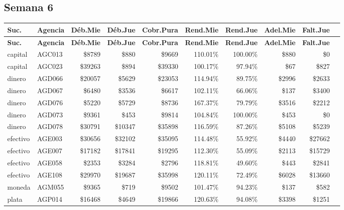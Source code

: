 \documentclass[11pt,a4paper]{article}
\newcommand{\money}[1]{\$\num{#1}}
\begin{document}
\begin{center}
\begin{longtable}{llrrrrrrrr}
\bottomrule
\end{longtable}
\end{center}

\subsection{Semana 6}


\begin{center}
\renewcommand{\arraystretch}{1.2}
\footnotesize
\begin{longtable}{llrrrrrrrr}
\toprule
\textbf{Suc.} & \textbf{Agencia}
  & {\textbf{D\'eb.Mie}} & {\textbf{D\'eb.Jue}} & {\textbf{Cobr.Pura}}
  & {\textbf{Rend.Mie}} & {\textbf{Rend.Jue}}
  & {\textbf{Adel.Mie}} & {\textbf{Falt.Jue}} \\
\midrule
\endfirsthead
\toprule
\textbf{Suc.} & \textbf{Agencia}
  & {\textbf{D\'eb.Mie}} & {\textbf{D\'eb.Jue}} & {\textbf{Cobr.Pura}}
  & {\textbf{Rend.Mie}} & {\textbf{Rend.Jue}}
  & {\textbf{Adel.Mie}} & {\textbf{Falt.Jue}} \\
\midrule
\endhead
capital & AGC013 & \money{8789} & \money{880} & \money{9669} & 110.01\% & 100.00\% & \money{880} & \money{0} \\
capital & AGC023 & \money{39263} & \money{894} & \money{39330} & 100.17\% & 97.94\% & \money{67} & \money{827} \\
dinero & AGD066 & \money{20057} & \money{5629} & \money{23053} & 114.94\% & 89.75\% & \money{2996} & \money{2633} \\
dinero & AGD067 & \money{6480} & \money{3536} & \money{6617} & 102.11\% & 66.06\% & \money{137} & \money{3400} \\
dinero & AGD076 & \money{5220} & \money{5729} & \money{8736} & 167.37\% & 79.79\% & \money{3516} & \money{2212} \\
dinero & AGD073 & \money{9361} & \money{453} & \money{9814} & 104.84\% & 100.00\% & \money{453} & \money{0} \\
dinero & AGD078 & \money{30791} & \money{10347} & \money{35898} & 116.59\% & 87.26\% & \money{5108} & \money{5239} \\
efectivo & AGE003 & \money{30656} & \money{32102} & \money{35095} & 114.48\% & 55.92\% & \money{4440} & \money{27662} \\
efectivo & AGE007 & \money{17182} & \money{17841} & \money{19295} & 112.30\% & 55.09\% & \money{2113} & \money{15729} \\
efectivo & AGE058 & \money{2353} & \money{3284} & \money{2796} & 118.81\% & 49.60\% & \money{443} & \money{2841} \\
efectivo & AGE108 & \money{29970} & \money{19687} & \money{35998} & 120.11\% & 72.49\% & \money{6028} & \money{13660} \\
moneda & AGM055 & \money{9365} & \money{719} & \money{9502} & 101.47\% & 94.23\% & \money{137} & \money{582} \\
plata & AGP014 & \money{16468} & \money{4649} & \money{19866} & 120.63\% & 94.08\% & \money{3398} & \money{1251} \\


\end{longtable}
\end{center}
\end{document}
